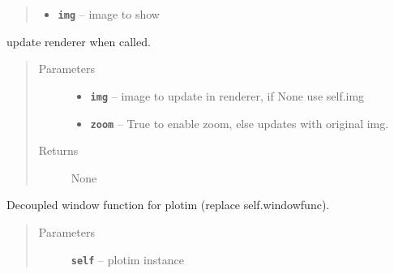 \documentclass[letterpaper,10pt,english]{sphinxmanual}
\begin{document}
\begin{fulllineitems}
\begin{fulllineitems}
\begin{quote}
\begin{description}
\begin{itemize}
\item {} 
\textbf{\texttt{img}} -- image to show

\end{itemize}

\end{description}\end{quote}

\end{fulllineitems}


\begin{fulllineitems}
\label{RRtoolbox.lib:RRtoolbox.lib.plotter.plotim.textbackground}
\end{fulllineitems}


\begin{fulllineitems}
\label{RRtoolbox.lib:RRtoolbox.lib.plotter.plotim.updaterenderer}
update renderer when called.
\begin{quote}\begin{description}
\item[{Parameters}] \leavevmode\begin{itemize}
\item {} 
\textbf{\texttt{img}} -- image to update in renderer, if None use self.img

\item {} 
\textbf{\texttt{zoom}} -- True to enable zoom, else updates with original img.

\end{itemize}

\item[{Returns}] \leavevmode
None

\end{description}\end{quote}

\end{fulllineitems}


\begin{fulllineitems}
\label{RRtoolbox.lib:RRtoolbox.lib.plotter.plotim.windowfunc}
Decoupled window function for plotim (replace self.windowfunc).
\begin{quote}\begin{description}
\item[{Parameters}] \leavevmode
\textbf{\texttt{self}} -- plotim instance

\end{description}\end{quote}

\end{fulllineitems}


\end{fulllineitems}
\end{document}
